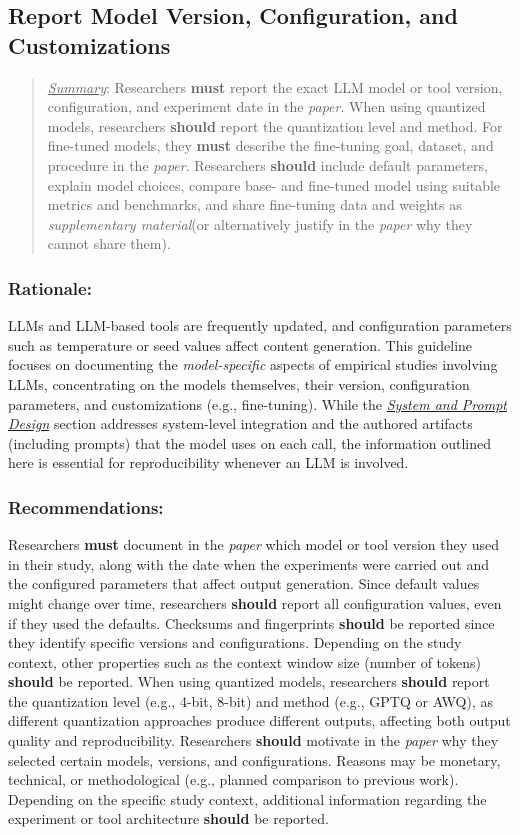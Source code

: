 \documentclass[smallextended]{svjour3}
\newcommand{\must}{\textbf{must}\xspace}
\newcommand{\should}{\textbf{should}\xspace}
\newcommand{\summary}{\underline{\emph{Summary}}\xspace}
\newcommand{\summary}{\textbf{\emph{Summary}}\xspace}
\newcommand{\paper}{\emph{paper}\xspace}
\newcommand{\supplementarymaterial}{\emph{supplementary material}\xspace}
\newcommand{\paper}{\emph{paper}\xspace}
\newcommand{\supplementarymaterial}{\emph{supplementary material}\xspace}
\newenvironment{framed}{\begin{quote}}{\end{quote}}
\newcommand{\design}{\hyperref[sec:report-system-and-prompt-design]{\emph{System and Prompt Design}}\xspace}
\newcommand{\design}{\href{/guidelines\#report-system-and-prompt-design}{\emph{System and Prompt Design}}\xspace}
\newcommand{\guidelinesubsubsection}[1]{\subsubsection{\bfseries #1:}}
\newcommand{\guidelinesubsubsection}[1]{\subsubsection{#1}}
\begin{document}
\subsection{Report Model Version, Configuration, and Customizations}
\label{sec:report-model-version-configuration-and-customizations}

\vspace{0.5\baselineskip}
\begin{framed}
\summary: Researchers \must report the exact LLM model or tool version, configuration, and experiment date in the \paper. When using quantized models, researchers \should report the quantization level and method. For fine-tuned models, they \must describe the fine-tuning goal, dataset, and procedure in the \paper. Researchers \should include default parameters, explain model choices, compare base- and fine-tuned model using suitable metrics and benchmarks, and share fine-tuning data and weights as \supplementarymaterial (or alternatively justify in the \paper why they cannot share them). \end{framed}

\guidelinesubsubsection{Rationale}

LLMs and LLM-based tools are frequently updated, and configuration parameters such as temperature or seed values affect content generation. 
This guideline focuses on documenting the \emph{model-specific} aspects of empirical studies involving LLMs, concentrating on the models themselves, their version, configuration parameters, and customizations (e.g., fine-tuning). While the \design section addresses system-level integration and the authored artifacts (including prompts) that the model uses on each call, the information outlined here is essential for reproducibility whenever an LLM is involved.

\guidelinesubsubsection{Recommendations}

Researchers \must document in the \paper which model or tool version they used in their study, along with the date when the experiments were carried out and the configured parameters that affect output generation.
Since default values might change over time, researchers \should report all configuration values, even if they used the defaults.
Checksums and fingerprints \should be reported since they identify specific versions and configurations.
Depending on the study context, other properties such as the context window size (number of tokens) \should be reported.
When using quantized models, researchers \should report the quantization level (e.g., 4-bit, 8-bit) and method (e.g., GPTQ or AWQ), as different quantization approaches produce different outputs, affecting both output quality and reproducibility.
Researchers \should motivate in the \paper why they selected certain models, versions, and configurations.
Reasons may be monetary, technical, or methodological (e.g., planned comparison to previous work).
Depending on the specific study context, additional information regarding the experiment or tool architecture \should be reported.
\end{document}
